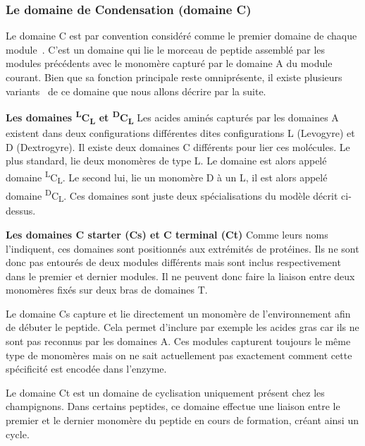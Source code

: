 \subsubsection{Le domaine de Condensation (domaine C)}

Le domaine C est par convention considéré comme le premier domaine de chaque module~\cite{stachelhaus_peptide_1998}.
C'est un domaine qui lie le morceau de peptide assemblé par les modules précédents avec le monomère capturé par le domaine A du module courant.
Bien que sa fonction principale reste omniprésente, il existe plusieurs variants~\cite{rausch_phylogenetic_2007} de ce domaine que nous allons décrire par la suite.

\textbf{Les domaines \textsuperscript{L}C\textsubscript{L} et \textsuperscript{D}C\textsubscript{L}}
Les acides aminés capturés par les domaines A existent dans deux configurations différentes dites configurations L (Levogyre) et D (Dextrogyre).
Il existe deux domaines C différents pour lier ces molécules.
Le plus standard, lie deux monomères de type L. Le domaine est alors appelé domaine \textsuperscript{L}C\textsubscript{L}.
Le second lui, lie un monomère D à un L, il est alors appelé domaine \textsuperscript{D}C\textsubscript{L}.
Ces domaines sont juste deux spécialisations du modèle décrit ci-dessus.

\textbf{Les domaines C starter (Cs) et C terminal (Ct)}
Comme leurs noms l'indiquent, ces domaines sont positionnés aux extrémités de protéines.
Ils ne sont donc pas entourés de deux modules différents mais sont inclus respectivement dans le premier et dernier modules.
Il ne peuvent donc faire la liaison entre deux monomères fixés sur deux bras de domaines T.

Le domaine Cs capture et lie directement un monomère de l'environnement afin de débuter le peptide.
Cela permet d'inclure par exemple les acides gras car ils ne sont pas reconnus par les domaines A.
Ces modules capturent toujours le même type de monomères mais on ne sait actuellement pas exactement comment cette spécificité est encodée dans l'enzyme.

Le domaine Ct est un domaine de cyclisation uniquement présent chez les champignons.
Dans certains peptides, ce domaine effectue une liaison entre le premier et le dernier monomère du peptide en cours de formation, créant ainsi un cycle\cite{gao_cyclization_2012}.

